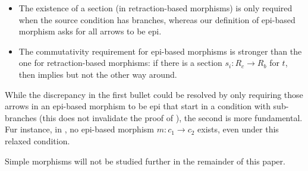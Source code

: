 %
\begin{itemize}
\item The existence of a section (in retraction-based morphisms) is only required when the source condition has branches, whereas our definition of epi-based morphism asks for all arrows to be epi.
\item The commutativity requirement for epi-based morphisms is stronger than the one for retraction-based morphisms: if there is a section $s_i: R_c \to R_b$ for $t$, then  implies  but not the other way around.
\end{itemize}
%
While the discrepancy in the first bullet could be resolved by only requiring those arrows in an epi-based morphism to be epi that start in a condition with sub-branches (this does not invalidate the proof of ), the second is more fundamental. Fur instance, in , no epi-based morphism $m:c_1\to c_2$ exists, even under this relaxed condition.


Simple morphisms will not be studied further in the remainder of this paper.
